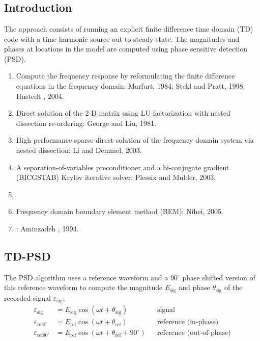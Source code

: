 \renewcommand{\pmk}{Nihei\_2007\_GJI\_TD phase sensitive detection}
\renewcommand{\prf}{Others/\pmk.pdf}
\renewcommand{\pti}{Frequency response modelling of seismic waves using
finite difference time domain with phase sensitive detection (TD-PSD)}
\renewcommand{\pay}{Kurt T. Nihei and Xiaoye Li, 2007}
\renewcommand{\pjo}{Geophys. J. Int.}
\renewcommand{\pda}{2019/8/17 Sun.}

\section{\pinfo}
\subsection{Introduction}
The approach consists of running an explicit finite difference time domain (TD)
code with a time harmonic source out to steady-state.
The magnitudes and phases at locations in the model are computed using
phase sensitive detection (PSD).

\begin{enumerate}[\hspace{10mm}*]
  \item Compute the frequency response by reformulating the finite difference
    equations in the frequency domain: Marfurt, 1984; Stekl and Pratt, 1998;
    Hustedt \etal, 2004.
  \item Direct solution of the 2-D matrix using LU-factorization with nested
    dissection re-ordering: George and Liu, 1981.
  \item High performance sparse direct solution of the frequency domain system
    via nested dissection: Li and Demmel, 2003.
  \item A separation-of-variables preconditioner and a bi-conjugate gradient
    (BICGSTAB) Krylov iterative solver: Plessix and Mulder, 2003.
  \item \sline
  \item Frequency domain boundary element method (BEM): Nihei, 2005.
  \item {}
    : 
    Aminzadeh \etal, 1994.
\end{enumerate}

\subsection{TD-PSD}
The PSD algorithm uses a reference waveform and a $90^\circ$ phase shifted
version of this reference waveform to compute the magnitude $E_\text{sig}$ and
phase $\theta_\text{sig}$ of the recorded signal $\varepsilon_\text{sig}$:
\begin{align*}
  \varepsilon_\text{sig} & = E_\text{sig} \cos(\omega t + \theta_\text{sig})
    & & \text{signal} \\
  \varepsilon_{\text{ref0}^\circ} & = E_\text{ref} \cos(\omega t
    + \theta_\text{ref}) & & \text{reference (in-phase)} \\
  \varepsilon_{\text{ref90}^\circ} & = E_\text{ref} \cos(\omega t
    + \theta_\text{ref} + 90^\circ) & & \text{reference (out-of-phase)} \\
\end{align*}

